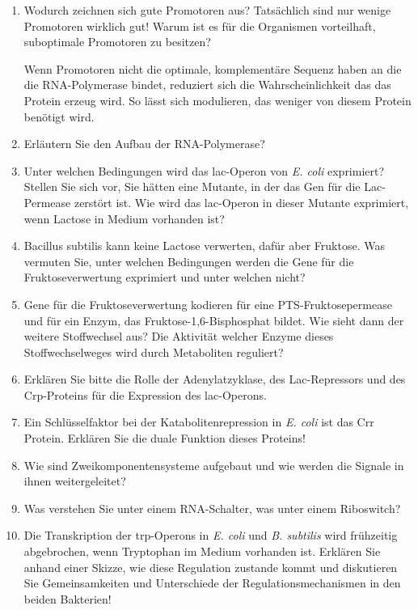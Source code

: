 \begin{enumerate}
	\item Wodurch zeichnen sich gute Promotoren aus? Tatsächlich sind nur wenige Promotoren wirklich gut! Warum ist es für die Organismen vorteilhaft, suboptimale Promotoren zu besitzen? 

		Wenn Promotoren nicht die optimale, komplementäre Sequenz haben an die die RNA-Polymerase bindet,
		reduziert sich die Wahrscheinlichkeit das das Protein erzeug wird.
		So lässt sich modulieren,
		das weniger von diesem Protein benötigt wird.

	\item Erläutern Sie den Aufbau der RNA-Polymerase?
	\item Unter welchen Bedingungen wird das lac-Operon von \emph{E. coli} exprimiert? Stellen Sie sich vor, Sie hätten eine Mutante, in der das Gen für die Lac-Permease zerstört  ist. Wie wird das lac-Operon in dieser Mutante exprimiert, wenn Lactose in Medium vorhanden ist?
	\item Bacillus subtilis kann keine Lactose verwerten, dafür aber Fruktose. Was vermuten Sie, unter welchen Bedingungen werden die Gene für die Fruktoseverwertung exprimiert und unter welchen nicht?
	\item  Gene für die Fruktoseverwertung kodieren für eine PTS-Fruktosepermease und für ein Enzym, das Fruktose-1,6-Bisphosphat bildet. Wie sieht dann der weitere Stoffwechsel aus? Die Aktivität welcher Enzyme dieses Stoffwechselweges wird durch Metaboliten reguliert?
	\item Erklären Sie  bitte die Rolle der Adenylatzyklase, des Lac-Repressors und des Crp-Proteins für die Expression des lac-Operons.
	\item Ein Schlüsselfaktor bei der Katabolitenrepression in \emph{E. coli} ist das Crr Protein. Erklären Sie die duale Funktion dieses Proteins!
	\item Wie sind Zweikomponentensysteme aufgebaut und wie werden die Signale in ihnen weitergeleitet?
	\item Was verstehen Sie unter einem RNA-Schalter, was unter einem Riboswitch?
	\item Die Transkription der trp-Operons in \emph{E. coli} und \emph{B. subtilis} wird frühzeitig abgebrochen, wenn Tryptophan im Medium vorhanden ist. Erklären Sie anhand einer Skizze, wie diese Regulation zustande kommt und diskutieren Sie Gemeinsamkeiten und Unterschiede der Regulationsmechanismen in den beiden Bakterien!
\end{enumerate}
